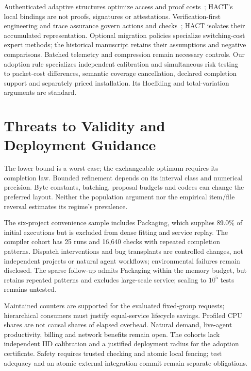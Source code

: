 \documentclass[10pt,journal,compsoc]{IEEEtran}
\theoremstyle{definition}\newtheorem{definition}[theorem]{Definition}
\begin{document}
Authenticated adaptive structures optimize access and proof costs~\cite{hmt};
HACT's local bindings are not proofs, signatures or attestations.
Verification-first engineering and trace assurance govern actions and
checks~\cite{aiware,traceassurance}; HACT isolates their accumulated
representation. Optional migration policies specialize switching-cost expert
methods; the historical manuscript retains their assumptions and negative
comparisons. Batched telemetry and compression remain necessary controls.
Our adoption rule specializes independent calibration and simultaneous risk
testing~\cite{learntest} to packet-cost differences, semantic coverage
cancellation, declared completion support and separately priced installation.
Its Hoeffding and total-variation arguments are standard.

\section{Threats to Validity and Deployment Guidance}
The lower bound is a worst case; the exchangeable optimum requires its
completion law. Bounded refinement depends on its interval class and numerical
precision. Byte constants, batching, proposal budgets and codecs can change
the preferred layout. Neither the population argument nor the empirical
item/file reversal estimates its regime's prevalence.

The six-project convenience sample includes Packaging, which supplies 89.0\%
of initial executions but is excluded from dense fitting and service replay.
The compiler cohort has 25 runs and 16,640 checks with repeated completion
patterns. Dispatch interventions and bug transplants are controlled changes,
not independent projects or natural agent workflows; environmental failures
remain disclosed. The sparse follow-up admits Packaging within the memory
budget, but retains repeated patterns and excludes large-scale service;
scaling to $10^5$ tests remains untested.

Maintained counters are supported for the evaluated fixed-group requests;
hierarchical consumers must justify equal-service lifecycle savings. Profiled
CPU shares are not causal shares of elapsed overhead. Natural demand,
live-agent productivity, billing and network benefits remain open. The cohorts
lack independent IID calibration and a justified deployment radius for the
adoption certificate. Safety requires trusted checking and atomic local
fencing; test adequacy and an atomic external integration commit remain
separate obligations.
\end{document}
